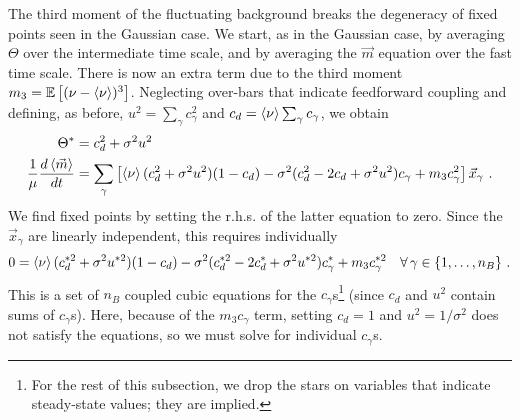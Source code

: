 The third moment of the fluctuating background breaks the degeneracy of fixed points seen in the Gaussian case. We start, as in the Gaussian case, by averaging $\Theta$ over the intermediate time scale, and by averaging the $\vec{m}$ equation over the fast time scale. There is now an extra term due to the third moment $m_3 = \mathbb{E}\left[ (\nu - \braket{\nu})^3 \right]$. Neglecting over-bars that indicate feedforward coupling and defining, as before, $u^2 = \sum_{\gamma} c_{\gamma}^2$ and $c_d = \braket{\nu} \sum_{\gamma} c_{\gamma}$, 
we obtain
\begin{align*}
	\Theta^* &= c_d^2 + \sigma^2 u^2 \nonumber \\
	\frac{1}{\mu} \frac{d \braket{\vec{m}}}{dt} &= \sum_{\gamma} \left[ \braket{\nu}(c_d^2 +\sigma^2 u^2)(1 - c_d) - \sigma^2 (c_d^2 - 2c_d + \sigma^2 u^2) c_{\gamma} + m_3 c_{\gamma}^2  \right] \vec{x}_{\gamma} \,\, . 
	\label{eq:mean_dynamics_m3}
\end{align*}
We find fixed points by setting the r.h.s. of the latter equation to zero. Since the $\vec{x}_{\gamma}$ are linearly independent, this requires individually
\begin{equation}
	0 = \braket{\nu}(c_d^{*2} +\sigma^2 u^{*2})(1 - c_d) - \sigma^2 (c_d^{*2} - 2c_d^* + \sigma^2 u^{*2})c_{\gamma}^* +  m_3 c_{\gamma}^{*2}   \quad \forall \,\gamma \in \{1, \ldots, n_B\} \,\, .
	\label{eq:fixed_pts_m3}
\end{equation}
This is a set of $n_B$ coupled cubic equations for the $c_{\gamma}$s{\protect\footnote{
For the rest of this subsection, we drop the stars on variables that indicate steady-state values; they are implied. 
}} (since $c_d$ and $u^2$ contain sums of $c_{\gamma}$s). Here, because of the $m_3 c_{\gamma}$ term, setting $c_d = 1$ and $u^2 = 1/\sigma^2$ does not satisfy the equations, so we must solve for individual $c_{\gamma}$s. 

